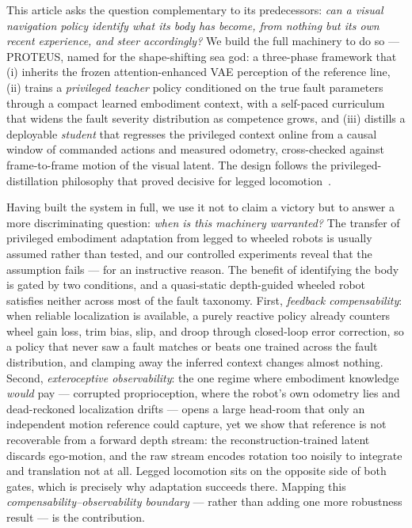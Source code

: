 \documentclass[journal]{IEEEtran}
\begin{document}
This article asks the question complementary to its predecessors:
\emph{can a visual navigation policy identify what its body has become, from
nothing but its own recent experience, and steer accordingly?} We build the
full machinery to do so --- PROTEUS, named for the shape-shifting sea god: a
three-phase framework that (i) inherits the frozen attention-enhanced VAE
perception of the reference line, (ii) trains a \emph{privileged teacher}
policy conditioned on the true fault parameters through a compact learned
embodiment context, with a self-paced curriculum that widens the fault
severity distribution as competence grows, and (iii) distills a deployable
\emph{student} that regresses the privileged context online from a causal
window of commanded actions and measured odometry, cross-checked against
frame-to-frame motion of the visual latent. The design follows the
privileged-distillation philosophy that proved decisive for legged
locomotion~\cite{Kumar2021RMA,Lee2020LearningQuadrupedal}.

Having built the system in full, we use it not to claim a victory but to
answer a more discriminating question: \emph{when is this machinery
warranted?} The transfer of privileged embodiment adaptation from legged to
wheeled robots is usually assumed rather than tested, and our controlled
experiments reveal that the assumption fails --- for an instructive reason.
The benefit of identifying the body is gated by two conditions, and a
quasi-static depth-guided wheeled robot satisfies neither across most of the
fault taxonomy. First, \emph{feedback compensability}: when reliable
localization is available, a purely reactive policy already counters wheel
gain loss, trim bias, slip, and droop through closed-loop error correction,
so a policy that never saw a fault matches or beats one trained across the
fault distribution, and clamping away the inferred context changes almost
nothing. Second, \emph{exteroceptive observability}: the one regime where
embodiment knowledge \emph{would} pay --- corrupted proprioception, where the
robot's own odometry lies and dead-reckoned localization drifts --- opens a
large head-room that only an independent motion reference could capture, yet
we show that reference is not recoverable from a forward depth stream: the
reconstruction-trained latent discards ego-motion, and the raw stream encodes
rotation too noisily to integrate and translation not at all. Legged
locomotion sits on the opposite side of both gates, which is precisely why
adaptation succeeds there. Mapping this
\emph{compensability--observability boundary} --- rather than adding one more
robustness result --- is the contribution.
\end{document}
